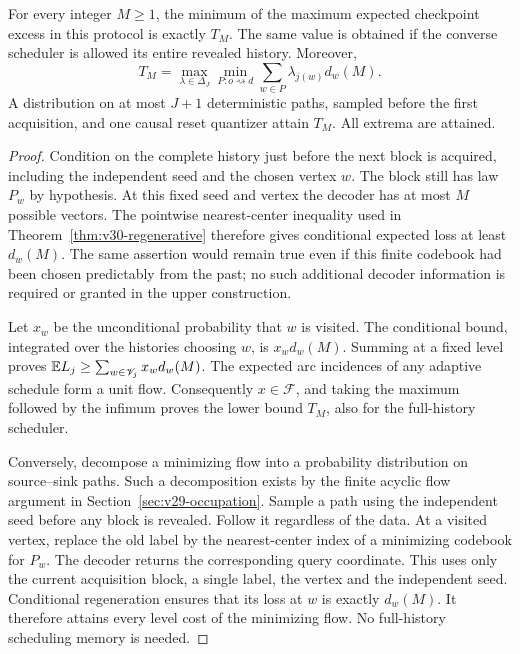 \begin{theorem}
\label{thm:v30-predictable-exact}
For every integer $M\ge1$, the minimum of the maximum expected
checkpoint excess in this protocol is exactly $T_M$. The same value
is obtained if the converse scheduler is allowed its entire revealed
history. Moreover,
\begin{equation}\label{eq:v30-predictable-dual}
 T_M=\max_{\lambda\in\Delta_J}
       \min_{P:o\rightsquigarrow d}
                \sum_{w\in P}\lambda_{j(w)}d_w(M).
\end{equation}
A distribution on at most $J+1$ deterministic paths, sampled before
the first acquisition, and one causal reset quantizer attain $T_M$.
All extrema are attained.
\end{theorem}
\begin{proof}
Condition on the complete history just before the next block is
acquired, including the independent seed and the chosen vertex $w$.
The block still has law $P_w$ by hypothesis. At this fixed seed and
vertex the decoder has at most $M$ possible vectors. The pointwise
nearest-center inequality used in
Theorem~\ref{thm:v30-regenerative} therefore gives conditional expected
loss at least $d_w(M)$. The same assertion would remain true even if
this finite codebook had been chosen predictably from the past; no
such additional decoder information is required or granted in the
upper construction.

Let $x_w$ be the unconditional probability that $w$ is visited. The
conditional bound, integrated over the histories choosing $w$, is
$x_wd_w(M)$. Summing at a fixed level proves
$\mathbb E L_j\ge\sum_{w\in\mathscr V_j}x_wd_w(M)$. The expected arc
incidences of any adaptive schedule form a unit flow. Consequently
$x\in\mathcal F$, and taking the maximum followed by the infimum
proves the lower bound $T_M$, also for the full-history scheduler.

Conversely, decompose a minimizing flow into a probability distribution
on source--sink paths. Such a decomposition exists by the finite
acyclic flow argument in Section~\ref{sec:v29-occupation}. Sample a
path using the independent seed before any block is revealed. Follow
it regardless of the data. At a visited vertex, replace the old label
by the nearest-center index of a minimizing codebook for $P_w$.
The decoder returns the corresponding query coordinate. This uses
only the current acquisition block, a single label, the vertex and
the independent seed. Conditional regeneration ensures that its loss
at $w$ is exactly $d_w(M)$. It therefore attains every level cost
of the minimizing flow. No full-history scheduling memory is needed.


\end{proof}
